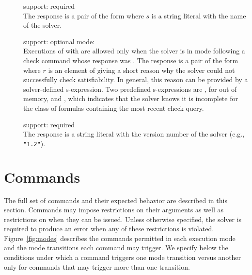 \begin{description}
\item[]
\quad support: required
\\
The response is a pair of the form
where $s$ is a string literal with the name of the solver.

\item[]
\quad support: optional
\quad mode: 
\\
Executions of  with  are allowed only
when the solver is in  mode following a check command
whose response was .
%
The response is a pair of the form
where $r$ is an element of  giving a short reason 
why the solver could not successfully check satisfiability.
In general, this reason can be provided by a solver-defined s-expression.
Two predefined s-expressions are
, for out of memory, and , which indicates 
that the solver knows it is incomplete for the class of formulas containing 
the most recent check query.

\item[]
\quad support: required
\\ 
The response is a string literal with the version number of the solver 
(e.g., \texttt{"1.2"}).
\end{description}


\section{Commands} \label{sec:commands}

The full set of commands and their expected behavior are described 
in this section.
Commands may impose restrictions on their arguments as well as restrictions 
on when they can be issued.
Unless otherwise specified, the solver is required to produce an error 
when any of these restrictions is violated.
Figure~\ref{fig:modes} describes the commands permitted in each execution mode 
and the mode transitions each command may trigger.
We specify below the conditions under which a command triggers one mode transition 
versus another only for commands that may trigger more than one transition. 

